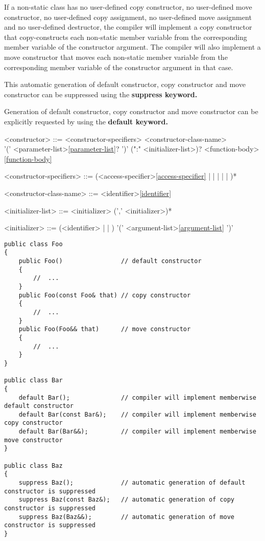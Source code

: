 \documentclass[a4paper,oneside,11pt]{article}
\begin{document}
If a non-static class has no user-defined copy constructor,
no user-defined move constructor, no user-defined copy assignment, no user-defined move assignment and no user-defined destructor,
the compiler will implement a copy constructor that
copy-constructs each non-static member variable from the corresponding member variable of the constructor argument.
The compiler will also implement a move constructor that moves each non-static member variable from the corresponding
member variable of the constructor argument in that case.

This automatic generation of default constructor, copy constructor and move constructor can be suppressed using the \bf{suppress} keyword.

Generation of default constructor, copy constructor and move constructor can be explicitly requested by using the \bf{default} keyword.

\begin{grammar}
\label{constructor}<constructor> ::= <constructor-specifiers> <constructor-class-name>\\
'(' <parameter-list>\ref{parameter-list}? ')' (":" <initializer-list>)? <function-body>\ref{function-body}

<constructor-specifiers> ::= (<access-specifier>\ref{access-specifier} |  |  |  |  | )*

<constructor-class-name> ::= <identifier>\ref{identifier}

<initializer-list> ::= <initializer> (',' <initializer>)*

<initializer>  ::= (<identifier> |  | ) '(' <argument-list>\ref{argument-list} ')'
\end{grammar}

\begin{lstlisting}[frame=trBL]
public class Foo
{
    public Foo()                // default constructor
    {
        //  ...
    }
    public Foo(const Foo& that) // copy constructor
    {
        //  ...
    }
    public Foo(Foo&& that)      // move constructor
    {
        //  ...
    }
}

public class Bar
{
    default Bar();              // compiler will implement memberwise default constructor
    default Bar(const Bar&);    // compiler will implement memberwise copy constructor
    default Bar(Bar&&);         // compiler will implement memberwise move constructor
}

public class Baz
{
    suppress Baz();             // automatic generation of default constructor is suppressed
    suppress Baz(const Baz&);   // automatic generation of copy constructor is suppressed
    suppress Baz(Baz&&);        // automatic generation of move constructor is suppressed
}
\end{lstlisting}
\end{document}
